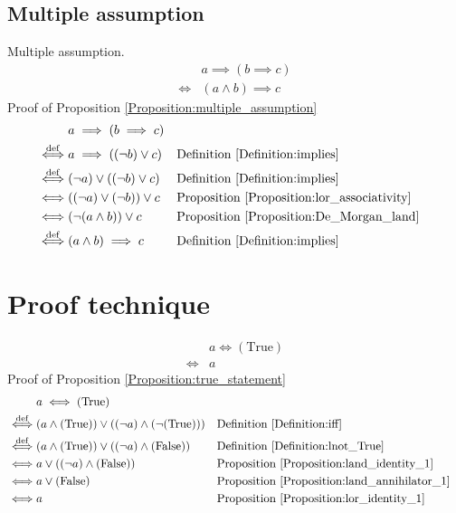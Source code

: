 \subsection{Multiple assumption}
\begin{prop}
\label{Proposition:multiple_assumption}
Multiple assumption.
\begin{align*}
& a \implies (b \implies c) \\
\iff & (a \land b) \implies c
\end{align*}
Proof of Proposition \ref{Proposition:multiple_assumption}
\begin{align*}
& a \implies (b \implies c) \\
\overset{\operatorname{def}}{\iff} & a \implies ((\lnot b) \lor c)
& & \text{Definition \ref{Definition:implies}} \\
\overset{\operatorname{def}}{\iff} & (\lnot a) \lor ((\lnot b) \lor c)
& & \text{Definition \ref{Definition:implies}} \\
\iff & ((\lnot a) \lor (\lnot b)) \lor c
& & \text{Proposition \ref{Proposition:lor_associativity}} \\
\iff & (\lnot (a \land b)) \lor c
& & \text{Proposition \ref{Proposition:De_Morgan_land}} \\
\overset{\operatorname{def}}{\iff} & (a \land b) \implies c
& & \text{Definition \ref{Definition:implies}} \\
\end{align*}
\end{prop}

\section{Proof technique}
\begin{prop}
\label{Proposition:true_statement}
\begin{align*}
& a \iff (\text{True}) \\
\iff & a
\end{align*}
Proof of Proposition \ref{Proposition:true_statement}
\begin{align*}
& a \iff (\text{True}) \\
\overset{\operatorname{def}}{\iff} & (a \land (\text{True})) \lor ((\lnot a) \land (\lnot (\text{True})))
& & \text{Definition \ref{Definition:iff}} \\
\overset{\operatorname{def}}{\iff} & (a \land (\text{True})) \lor ((\lnot a) \land (\text{False}))
& & \text{Definition \ref{Definition:lnot_True}} \\
\iff & a \lor ((\lnot a) \land (\text{False}))
& & \text{Proposition \ref{Proposition:land_identity_1}} \\
\iff & a \lor (\text{False})
& & \text{Proposition \ref{Proposition:land_annihilator_1}} \\
\iff & a
& & \text{Proposition \ref{Proposition:lor_identity_1}} \\
\end{align*}
\end{prop}

